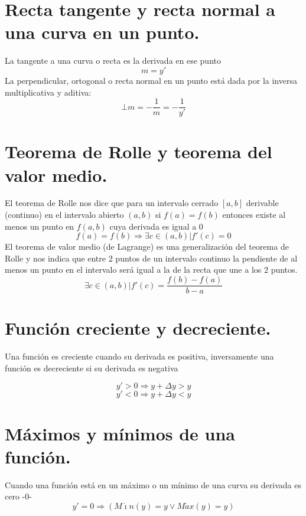 \documentclass[oneside,spanish,letterpaper]{extbook}
\theoremstyle{mythmstyle}
\begin{document}
\section{Recta tangente y recta normal a una curva en un punto.}
La tangente a una curva o recta es la derivada en ese punto
\begin{equation}
 m=y'
\end{equation}
La perpendicular, ortogonal o recta normal en un punto está dada por la inversa multiplicativa y aditiva:
\begin{equation}
 \bot m=-\frac{1}{m}=-\frac{1}{y'} 
\end{equation}

\section{Teorema de Rolle y teorema del valor medio.}
El teorema de Rolle nos dice que para un intervalo cerrado $[a,b]$ derivable (continuo)
en el intervalo abierto $(a,b)$ si $f(a)=f(b)$ entonces existe al menos un
punto en $f(a,b)$ cuya derivada es igual a $0$
\begin{equation}
  f(a)=f(b) \Rightarrow \exists c \in (a,b)|f'(c)=0
\end{equation}
El teorema de valor medio (de Lagrange) es una generalización del teorema de Rolle y nos indica que entre 2 puntos de un
intervalo continuo la pendiente de al menos un punto en el intervalo será igual a la de la recta que une a los 2 puntos.
\begin{equation}
 \exists c \in (a,b)|f'(c)=\frac{f(b)-f(a)}{b-a}
\end{equation}


\section{Función creciente y decreciente.}
Una función es creciente cuando su derivada es positiva, inversamente una función es decreciente si su derivada es negativa

\begin{equation}
 y'>0 \Rightarrow y+\Delta y>y
\end{equation}
\begin{equation}
 y'<0 \Rightarrow y+\Delta y<y
\end{equation}

\section{Máximos y mínimos de una función.}
Cuando una función está en un máximo o un mínimo de una curva su derivada es cero -$0$-
\begin{equation}
 y'=0 \Rightarrow \left( M\acute{\imath}n(y)= y \vee M\acute{a}x(y)= y \right)
\end{equation}
\end{document}
